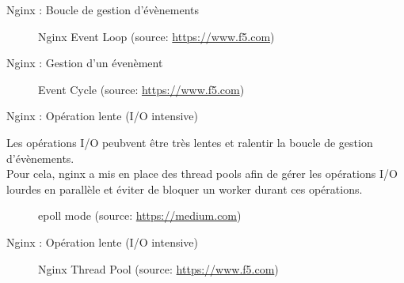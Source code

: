 \documentclass[aspectratio=43,8pt]{beamer}
\begin{document}
\begin{frame}{Nginx : Boucle de gestion d'évènements}
\begin{figure}
        \centering
        \caption{\small Nginx Event Loop (source: \href{https://www.f5.com/company/blog/nginx/thread-pools-boost-performance-9x}{https://www.f5.com})}
\end{figure}

\end{frame}

\begin{frame}{Nginx : Gestion d'un évenèment}
\centering
\begin{figure}
        \centering
        \caption{\small Event Cycle (source: \href{https://www.f5.com/company/blog/nginx/thread-pools-boost-performance-9x}{https://www.f5.com})}
\end{figure}
\end{frame}

\begin{frame}{Nginx : Opération lente (I/O intensive)}
\begin{card}
	Les opérations I/O peubvent être très lentes et ralentir la boucle de gestion d'évènements.\\
	Pour cela, nginx a mis en place des thread pools afin de gérer les opérations I/O lourdes en parallèle et éviter de bloquer un worker durant ces opérations.
\end{card}
\begin{figure}
        \centering
        \caption{\small epoll mode (source: \href{https://medium.com/@avocadi/what-is-epoll-9bbc74272f7c}{https://medium.com})}
\end{figure}

\end{frame}

\begin{frame}{Nginx : Opération lente (I/O intensive)}
\begin{figure}
        \centering
        \caption{\small Nginx Thread Pool (source: \href{https://www.f5.com/company/blog/nginx/thread-pools-boost-performance-9x}{https://www.f5.com})}
\end{figure}
\end{frame}
\end{document}
